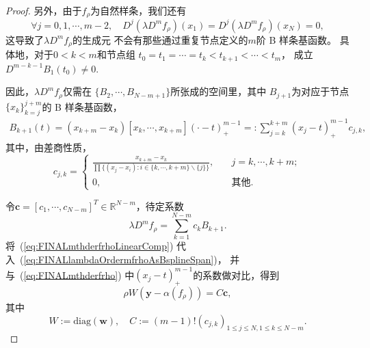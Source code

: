 \begin{proof}
另外，由于$f_{\rho}$为自然样条，我们还有
\begin{displaymath}
  \forall j=0,1,\cdots,m-2,\quad
  D^{j}(\lambda D^{m}f_{\rho})(x_{1})=
  D^{j}(\lambda D^{m}f_{\rho})(x_{N})=0,
\end{displaymath}
这导致了$\lambda D^{m}f_{\rho}$的生成元
不会有那些通过重复节点定义的$m$阶 B 样条基函数。
具体地，对于$0<k<m$和节点组
$t_{0}=t_{1}=\cdots=t_{k}<t_{k+1}<\cdots<t_{m}$，
成立$D^{m-k-1}B_{1}(t_{0})\neq 0$.

因此，$\lambda D^{m}f_{\rho}$仅需在
$\{B_{2},\cdots,B_{N-m+1}\}$所张成的空间里，其中
$B_{j+1}$为对应于节点$\{x_{k}\}_{k=j}^{j+m}$的
B 样条基函数，
\begin{equation}
  \label{eq:FINALmthderfrhoLinearComp}
  \begin{aligned}
    B_{k+1}(t)
    =(x_{k+m}-x_{k})[x_{k},\cdots,x_{k+m}](\cdot - t)_{+}^{m-1}
    =:\sum_{j=k}^{k+m}(x_{j}-t)_{+}^{m-1}c_{j,k},
  \end{aligned}
\end{equation}
其中，由差商性质，
\begin{displaymath}
  c_{j,k}=
    \begin{cases}
      \frac{x_{k+m}-x_k}{\prod\{ (x_{j}-x_{i}):i\in\{k,\cdots,k+m\}
      \backslash\{j\} \}}, \quad &j=k,\cdots,k+m;\\
      0,\quad&\text{其他}.
    \end{cases}
\end{displaymath}
  
令$\mathbf{c}=[c_{1},\cdots,c_{N-m}]^{T}\in \mathbb{R}^{N-m}$，待定系数
\begin{equation}
  \label{eq:FINALlambdaOrdermfrhoAsBsplineSpan}
  \lambda D^{m}f_{\rho}=\sum_{k=1}^{N-m}c_{k}B_{k+1}.
\end{equation}
将~(\ref{eq:FINALmthderfrhoLinearComp})
代入~(\ref{eq:FINALlambdaOrdermfrhoAsBsplineSpan})，
并与~(\ref{eq:FINALmthderfrho}) 中$(x_{j}-t)_{+}^{m-1}$的系数做对比，得到
\begin{equation}
  \label{eq:FINALrelationOfCc}
  \rho W(\mathbf{y}-\alpha(f_{\rho}))=C\mathbf{c},
\end{equation}
其中
\begin{displaymath}
  W:=\text{diag}(\mathbf{w}),\quad
  C:=(m-1)!(c_{j,k})_{1\le j\le N,1\le k\le N-m}.
\end{displaymath}


\end{proof}
